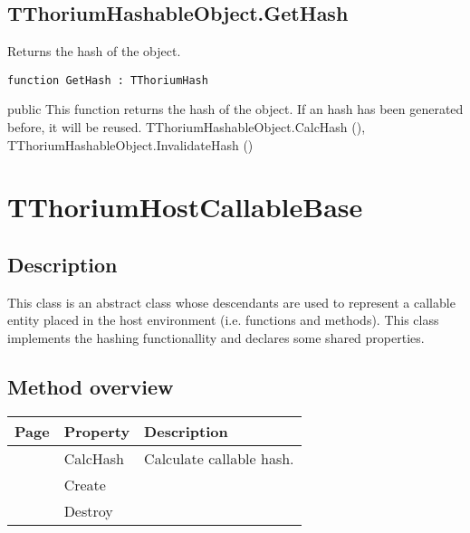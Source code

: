 \subsection{TThoriumHashableObject.GetHash}
\label{thoriumcorepkg:thorium:tthoriumhashableobject:gethash}
\begin{FPCList}
\Synopsis
Returns the hash of the object.\Declaration 

\begin{verbatim}
function GetHash : TThoriumHash
\end{verbatim}
\Visibility
public
\Description
This function returns the hash of the object. If an hash has been generated before, it will be reused.\SeeAlso
TThoriumHashableObject.CalcHash (\pageref{thoriumcorepkg:thorium:tthoriumhashableobject:calchash}),
TThoriumHashableObject.InvalidateHash (\pageref{thoriumcorepkg:thorium:tthoriumhashableobject:invalidatehash})\end{FPCList}
\section{TThoriumHostCallableBase}
\label{thoriumcorepkg:thorium:tthoriumhostcallablebase}
\subsection{Description}
This class is an abstract class whose descendants are used to represent a callable entity placed in the host environment (i.e. functions and methods). This class implements the hashing functionallity and declares some shared properties.%
\subsection{Method overview}
\label{thoriumcorepkg:thorium:tthoriumhostcallablebase:methods}
\begin{tabularx}{\textwidth}{llX}
Page & Property & Description  \\ \hline
\pageref{thoriumcorepkg:thorium:tthoriumhostcallablebase:calchash} & CalcHash  & Calculate callable hash. \\
\pageref{thoriumcorepkg:thorium:tthoriumhostcallablebase:create} & Create  &  \\
\pageref{thoriumcorepkg:thorium:tthoriumhostcallablebase:destroy} & Destroy  &  \\
\hline
\end{tabularx}
